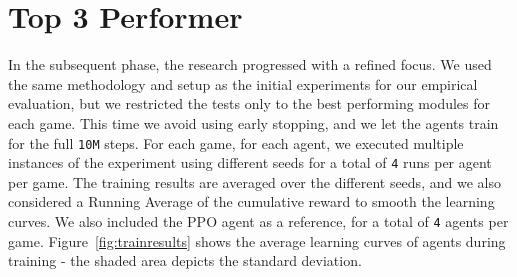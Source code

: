 \section{Top 3 Performer}\label{sec:top-3-performer}
In the subsequent phase, the research progressed with a refined focus.
We used the same methodology and setup as the initial experiments for our empirical evaluation, but we restricted the tests only to the best performing modules for each game.
This time we avoid using early stopping, and we let the agents train for the full \texttt{10M} steps.
For each game, for each agent, we executed multiple instances of the experiment using different seeds for a total of \texttt{4} runs per agent per game.
The training results are averaged over the different seeds, and we also considered a Running Average of the cumulative reward to smooth the learning curves.
We also included the PPO agent as a reference, for a total of \texttt{4} agents per game.
Figure~\ref{fig:trainresults} shows the average learning curves of agents during training - the shaded area depicts the standard deviation.



